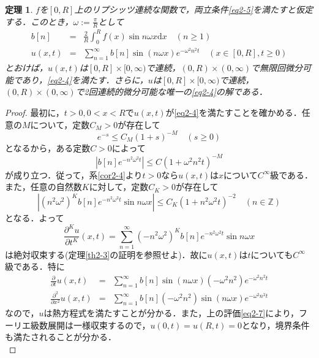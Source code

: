\documentclass[a4j]{jsbook}
\newtheorem{theorem}{定理}
\numberwithin{theorem}{chapter}  %
\begin{document}
\begin{theorem}
\label{th2-6}
\(f\)を\([0, R]\)上のリプシッツ連続な関数で，両立条件\eqref{eq2-5}を満たすと仮定する．このとき，\(\displaystyle\omega:=\frac{\pi}{R}\)として
\begin{eqnarray*}
b[n]&=&\frac{2}{R}\int_0^R f(x)\sin n\omega x\mathrm{d}x\quad (n\geq 1) \\
u(x, t)&=&\sum_{n=1}^\infty b[n]\sin(n\omega x)e^{-\omega^2 n^2t}\quad (x\in[0, R], t\geq 0)
\end{eqnarray*}
とおけば，\(u(x, t)\)は\([0, R]\times[0, \infty)\)で連続，\((0, R)\times(0, \infty)\)で無限回微分可能であり，\eqref{eq2-4}を満たす．さらに，\(u\)は\([0, R]\times[0, \infty)\)で連続，\((0, R)\times(0, \infty)\)で2回連続的微分可能な唯一の\eqref{eq2-4}の解である．
\end{theorem}
\begin{proof}
最初に，\(t>0, 0<x<R\)で\(u(x, t)\)が\eqref{eq2-4}を満たすことを確かめる．任意の\(M\)について，定数\(C_M>0\)が存在して
\begin{equation*}
    e^{-s}\leq C_M(1+s)^{-M}\quad (s\geq 0)
\end{equation*}
となるから，ある定数\(C>0\)によって
\begin{equation}
    \left|b[n]e^{-n^2\omega^2 t}\right|\leq C(1+\omega^2 n^2t)^{-M} \label{eq2-7}
\end{equation}
が成り立つ．従って，系\ref{cor2-4}より\(t>0\)なら\(u(x, t)\)は\(x\)について\(C^\infty\)級である．また，任意の自然数\(K\)に対して，定数\(C_K>0\)が存在して
\begin{equation*}
    \left|(n^2\omega^2)^K b[n]e^{-n^2\omega^2 t}\sin n\omega x\right|\leq C_K(1+n^2\omega^2 t)^{-2}\quad (n\in\mathbb{Z})
\end{equation*}
となる．よって
\begin{equation*}
    \frac{\partial^K u}{\partial t^K}(x, t)=\sum_{n=1}^\infty　(-n^2\omega^2)^K b[n]e^{-n^2\omega^2 t}\sin n\omega x
\end{equation*}
は絶対収束する(定理\ref{th2-3}の証明を参照せよ)．故に\(u(x, t)\)は\(t\)についても\(C^\infty\)級である．特に
\begin{eqnarray*}
\frac{\partial}{\partial t}u(x, t)&=&\sum_{n=1}^\infty b[n]\sin(n\omega x)(-\omega^2 n^2)e^{-\omega^2 n^2t} \\
\frac{\partial^2}{\partial x^2}u(x, t)&=&\sum_{n=1}^\infty b[n](-\omega^2 n^2)\sin(n\omega x)e^{-\omega^2 n^2t}
\end{eqnarray*}
なので，\(u\)は熱方程式を満たすことが分かる．また，上の評価\eqref{eq2-7}により，フーリエ級数展開は一様収束するので，\(u(0, t)=u(R, t)=0\)となり，境界条件も満たされることが分かる．\\

\end{proof}
\end{document}
